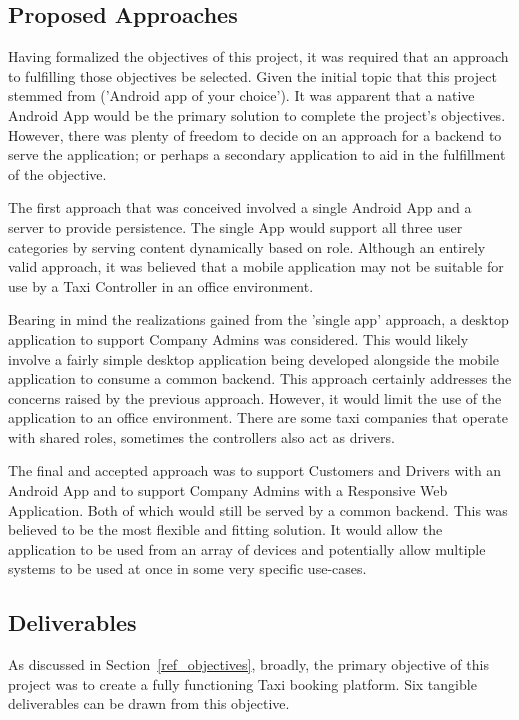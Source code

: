 \subsection{Proposed Approaches}
Having formalized the objectives of this project, it was required that an approach to fulfilling those objectives be selected. Given the initial topic that this project stemmed from ('Android app of your choice'). It was apparent that a native Android App would be the primary solution to complete the project's objectives. However, there was plenty of freedom to decide on an approach for a backend to serve the application; or perhaps a secondary application to aid in the fulfillment of the objective.

The first approach that was conceived involved a single Android App and a server to provide persistence. The single App would support all three user categories by serving content dynamically based on role. Although an entirely valid approach, it was believed that a mobile application may not be suitable for use by a Taxi Controller in an office environment.

Bearing in mind the realizations gained from the 'single app' approach, a desktop application to support Company Admins was considered. This would likely involve a fairly simple desktop application being developed alongside the mobile application to consume a common backend. This approach certainly addresses the concerns raised by the previous approach. However, it would limit the use of the application to an office environment. There are some taxi companies that operate with shared roles, sometimes the controllers also act as drivers.

The final and accepted approach was to support Customers and Drivers with an Android App and to support Company Admins with a Responsive Web Application. Both of which would still be served by a common backend. This was believed to be the most flexible and fitting solution. It would allow the application to be used from an array of devices and potentially allow multiple systems to be used at once in some very specific use-cases.

\subsection{Deliverables}
As discussed in Section~\ref{ref_objectives}, broadly, the primary objective of this project was to create a fully functioning Taxi booking platform. Six tangible deliverables can be drawn from this objective.

